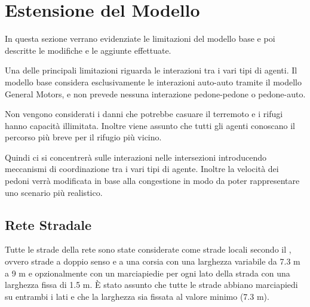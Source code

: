 \section{Estensione del Modello}
\label{sec:estensione}
In questa sezione verrano evidenziate le limitazioni del modello base e poi descritte le modifiche e le aggiunte effettuate.

Una delle principali limitazioni riguarda le interazioni tra i vari tipi di agenti.
Il modello base considera esclusivamente le interazioni auto-auto
tramite il modello General Motors, e non prevede nessuna interazione pedone-pedone o pedone-auto.

Non vengono considerati i danni che potrebbe casuare il terremoto e i rifugi hanno capacità illimitata.
%
Inoltre viene assunto che tutti gli agenti conoscano il percorso più breve per il rifugio più vicino.

Quindi ci si concentrerà sulle interazioni nelle intersezioni introducendo meccanismi di coordinazione tra i vari tipi di agente.
Inoltre la velocità dei pedoni verrà modificata in base alla congestione in modo da poter rappresentare uno scenario più realistico.

\subsection{Rete Stradale}
Tutte le strade della rete sono state considerate come strade locali secondo il \textcite{seaside2010tsp},
ovvero strade a doppio senso e a una corsia con una larghezza variabile da 7.3 m a 9 m e opzionalmente con
un marciapiedie per ogni lato della strada con una larghezza fissa di 1.5 m.
%
È stato assunto che tutte le strade abbiano marciapiedi su entrambi i lati e che la larghezza sia fissata al valore minimo (7.3 m).

